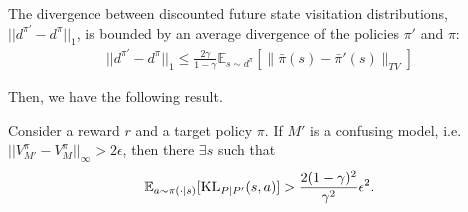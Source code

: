 \begin{tcolorbox}
\begin{lemma}
    \label{le:achiam}
        The divergence between discounted future state visitation distributions, $||d^{\pi'}-d^\pi||_1$, is bounded by an average divergence of the policies $\pi'$ and $\pi$:
        \begin{align*}
            ||d^{\pi'}-d^\pi||_1\le \frac{2\gamma}{1-\gamma}\mathbb{E}_{s\sim d^\pi}[\|
        \bar \pi(s)-\bar\pi'(s)\|_{TV}]
        \end{align*}
    \end{lemma}
    \end{tcolorbox}
Then, we have the following result.
\begin{tcolorbox}
\begin{lemma}
\label{le:necessary_condition_confusing_model}
Consider a reward $r$ and a target policy $\pi$. If $M'$ is a confusing model, i.e. $||V^\pi_{M'} - V^\pi_M||_\infty > 2\epsilon$, then there  $\exists s$ such that
    \begin{align*}
       \mathbb{E}_{a\sim\pi(\cdot|s)}[{\rm KL}_{P|P'}(s,a)]>\frac{2(1-\gamma)^2}{\gamma^2}\epsilon^2.
    \end{align*}
\end{lemma}
\end{tcolorbox}
